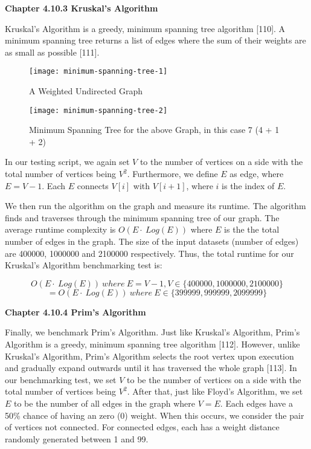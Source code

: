 \bigskip
\textbf{{\normalsize Chapter 4.10.3 Kruskal's Algorithm}}

Kruskal's Algorithm is a greedy, minimum spanning tree algorithm [110]. A minimum spanning tree returns a list of edges where the sum of their weights are as small as possible [111].

\newpage
\begin{figure}[hp]
\centering
\texttt{[image: minimum-spanning-tree-1]}
\caption{\footnotesize{A Weighted Undirected Graph}}
\captionsetup{aboveskip=0pt,font=it}
\end{figure}
\bigskip

\begin{figure}[hp]
\centering
\texttt{[image: minimum-spanning-tree-2]}
\caption{\footnotesize{Minimum Spanning Tree for the above Graph, in this case 7 (4 + 1 + 2)}}
\captionsetup{aboveskip=0pt,font=it}
\end{figure}
\bigskip

In our testing script, we again set \(V\) to the number of vertices on a side with the total number of vertices being \(V^2\). Furthermore, we define \(E\) as edge, where \(E = V - 1\). Each \(E\) connects \(V[i]\) with \(V[i+1]\), where \(i\) is the index of \(E\).

We then run the algorithm on the graph and measure its runtime. The algorithm finds and traverses through the minimum spanning tree of our graph. The average runtime complexity is \(O(E\cdot\ Log(E))\) where \(E\) is the the total number of edges in the graph. The size of the input datasets (number of edges) are 400000, 1000000 and 2100000 respectively. Thus, the total runtime for our Kruskal’s Algorithm benchmarking test is:

\[ O(E\cdot\ Log(E))\ where\ E = V - 1, V \in \{400000, 1000000, 2100000\} \]
\[ =O(E\cdot\ Log(E))\ where\ E \in \{399999, 999999, 2099999\} \]

\bigskip
\textbf{{\normalsize Chapter 4.10.4 Prim's Algorithm}}

Finally, we benchmark Prim's Algorithm. Just like Kruskal’s Algorithm, Prim's Algorithm is a greedy, minimum spanning tree algorithm [112]. However, unlike Kruskal’s Algorithm, Prim's Algorithm selects the root vertex upon execution and gradually expand outwards until it has traversed the whole graph [113]. In our benchmarking test, we set \(V\) to be the number of vertices on a side with the total number of vertices being \(V^2\). After that, just like Floyd’s Algorithm, we set \(E\) to be the number of all edges in the graph where \(V = E\). Each edges have a 50\% chance of having an zero (0) weight. When this occurs, we consider the pair of vertices not connected. For connected edges, each has a weight distance randomly generated between 1 and 99.

